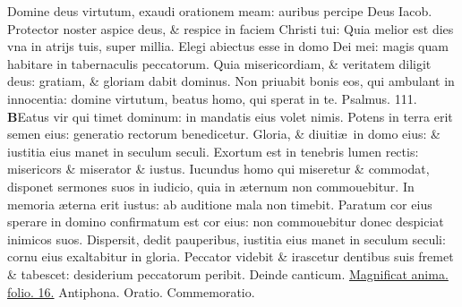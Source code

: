 \documentclass[a5paper,10pt]{book}
\def\ae{æ}
\begin{document}
\begin{multicols*}{2}
\newline \color{red} D\color{black}omine deus virtutum, exaudi orationem meam: auribus percipe Deus Iacob.
\newline \color{red} P\color{black}rotector noster aspice deus, \& respice in faciem Christi tui:
\newline \color{red} Q\color{black}uia melior est dies vna in atrijs tuis, super millia.
\newline \color{red} E\color{black}legi abiectus esse in domo Dei mei: magis quam habitare in tabernaculis peccatorum.
\newline \color{red} Q\color{black}uia misericordiam, \& veritatem diligit deus: gratiam, \& gloriam dabit dominus.
\newline \color{red} N\color{black}on priuabit bonis eos, qui ambulant in innocentia: domine virtutum, beatus homo, qui sperat in te.
\newline \color{red} Psalmus. \hypertarget{ps111}{111.} \color{black}
\vspace{-.5em}
\lettrine[lines=2]{\bfseries \color{red} B}{}Eatus vir qui timet dominum: in mandatis eius volet nimis.
\newline \color{red} P\color{black}otens in terra erit semen eius: generatio rectorum benedicetur.
\newline \color{red} G\color{black}loria, \& diuiti\ae \ in domo eius: \& iustitia eius manet in seculum seculi.
\newline \color{red} E\color{black}xortum est in tenebris lumen rectis: misericors \& miserator \& iustus.
\newline \color{red} I\color{black}ucundus homo qui miseretur \& commodat, disponet sermones suos in iudicio, quia in \ae ternum non commouebitur.
\newline \color{red} I\color{black}n memoria \ae terna erit iustus: ab auditione mala non timebit.
\newline \color{red} P\color{black}aratum cor eius sperare in domino confirmatum est cor eius: non commouebitur donec despiciat inimicos suos.
\newline \color{red} D\color{black}ispersit, dedit pauperibus, iustitia eius manet in seculum seculi: cornu eius exaltabitur in gloria.
\newline \color{red} P\color{black}eccator videbit \& irascetur dentibus suis fremet \& tabescet: desiderium peccatorum peribit. \quad \color{red} Deinde canticum. \color{black} \hyperlink{Magnificat}{Magnificat anima. folio. 16.} \color{red} Antiphona. Oratio. Commemoratio. \color{black}

\end{multicols*}
\end{document}
